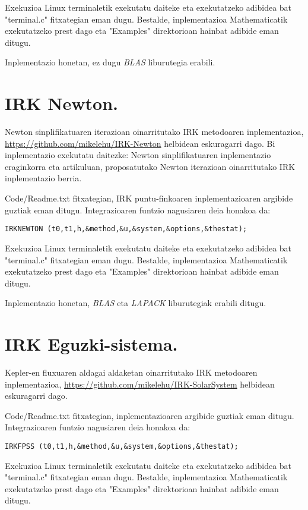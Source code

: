 Exekuzioa Linux terminaletik exekutatu daiteke eta exekutatzeko adibidea bat  "terminal.c" fitxategian eman dugu. 
Bestalde, inplementazioa Mathematicatik exekutatzeko prest dago eta "Examples" direktorioan hainbat adibide eman ditugu.    

Inplementazio honetan, ez dugu \emph{BLAS} liburutegia erabili. 

\section{IRK Newton.}

Newton sinplifikatuaren iterazioan oinarritutako IRK metodoaren inplementazioa, \url{https://github.com/mikelehu/IRK-Newton} helbidean eskuragarri dago. Bi inplementazio exekutatu daitezke: Newton sinplifikatuaren inplementazio eraginkorra eta artikuluan, proposatutako Newton iterazioan oinarritutako IRK inplementazio berria.

Code/Readme.txt fitxategian, IRK puntu-finkoaren inplementazioaren argibide guztiak eman ditugu. Integrazioaren funtzio nagusiaren deia honakoa da:   
\begin{lstlisting}
IRKNEWTON (t0,t1,h,&method,&u,&system,&options,&thestat);
\end{lstlisting}

Exekuzioa Linux terminaletik exekutatu daiteke eta exekutatzeko adibidea bat  "terminal.c" fitxategian eman dugu. 
Bestalde, inplementazioa Mathematicatik exekutatzeko prest dago eta "Examples" direktorioan hainbat adibide eman ditugu. 

Inplementazio honetan, \emph{BLAS} eta \emph{LAPACK} liburutegiak erabili ditugu.

\section{IRK Eguzki-sistema.}

Kepler-en fluxuaren aldagai aldaketan oinarritutako IRK metodoaren inplementazioa, \url{https://github.com/mikelehu/IRK-SolarSystem} helbidean eskuragarri dago.  

Code/Readme.txt fitxategian, inplementazioaren argibide guztiak eman ditugu. Integrazioaren funtzio nagusiaren deia honakoa da:   
\begin{lstlisting}
IRKFPSS (t0,t1,h,&method,&u,&system,&options,&thestat);
\end{lstlisting}

Exekuzioa Linux terminaletik exekutatu daiteke eta exekutatzeko adibidea bat  "terminal.c" fitxategian eman dugu. 
Bestalde, inplementazioa Mathematicatik exekutatzeko prest dago eta "Examples" direktorioan hainbat adibide eman ditugu.  

